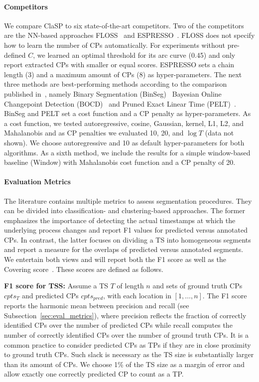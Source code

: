 \documentclass[pdflatex,sn-basic]{sn-jnl}
\begin{document}
\paragraph{Competitors}
We compare ClaSP to six state-of-the-art competitors. Two of the competitors are the NN-based approaches FLOSS~\citep{gharghabi2017matrix} and ESPRESSO~\citep{Deldari2020ESPRESSOEA}. FLOSS does not specify how to learn the number of CPs automatically. For experiments without pre-defined $C$, we learned an optimal threshold for its arc curve (0.45) and only report extracted CPs with smaller or equal scores. ESPRESSO sets a chain length (3) and a maximum amount of CPs (8) as hyper-parameters. The next three methods are best-performing methods according to the comparison published in~\citep{van2020evaluation}, namely Binary Segmentation (BinSeg)~\citep{scott1974cluster} Bayesian Online Changepoint Detection (BOCD)~\citep{adams2007bayesian} and Pruned Exact Linear Time (PELT)~\citep{Killick2012OptimalDO}. BinSeg and PELT set a cost function and a CP penalty as hyper-parameters. As a cost function, we tested autoregressive, cosine, Gaussian, kernel, L1, L2, and Mahalanobis and as CP penalties we evaluated 10, 20, and $\log T$ (data not shown). We choose autoregressive and 10 as default hyper-parameters for both algorithms. As a sixth method, we include the results for a simple window-based baseline (Window) \citep{truong2020selective} with Mahalanobis cost function and a CP penalty of 20.

\paragraph{Evaluation Metrics}
The literature contains multiple metrics to assess segmentation procedures. They can be divided into classification- and clustering-based approaches. The former emphasizes the importance of detecting the actual timestamps at which the underlying process changes and report F1 values for predicted versus annotated CPs. In contrast, the latter focuses on dividing a TS into homogeneous segments and report a measure for the overlaps of predicted versus annotated segments. We entertain both views and will report both the F1 score as well as the Covering score~\citep{van2020evaluation}. These scores are defined as follows. 

\textbf{F1 score for TSS:} Assume a TS $T$ of length $n$ and sets of ground truth CPs $cpts_{T}$ and predicted CPs $cpts_{pred}$, with each location in $[1,\dots,n]$. The F1 score reports the harmonic mean between precision and recall (see Subsection~\ref{sec:eval_metrics}), where precision reflects the fraction of correctly identified CPs over the number of predicted CPs while recall computes the number of correctly identified CPs over the number of ground truth CPs. It is a common practice to consider predicted CPs as TPs if they are in close proximity to ground truth CPs. Such slack is necessary as the TS size is substantially larger than its amount of CPs. We choose 1\% of the TS size as a margin of error and allow exactly one correctly predicted CP to count as a TP.
\end{document}
